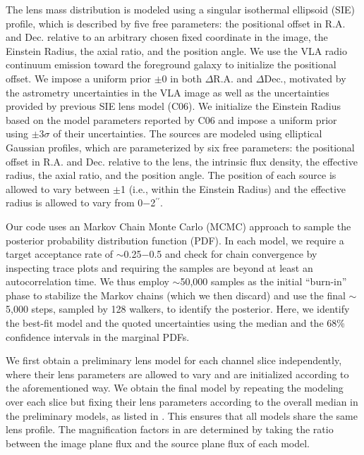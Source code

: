 \documentclass[]{emulateapj}
\begin{document}
The lens mass distribution is modeled using a singular isothermal
ellipsoid (SIE) profile, which is described by five free parameters: the
positional offset in R.A. and Dec. relative to an arbitrary chosen
fixed coordinate in the image, the Einstein Radius, the axial ratio, and the
position angle. We use the VLA radio continuum emission toward
the foreground galaxy to initialize the positional offset. We impose a
uniform prior $\pm$0 in both $\Delta$R.A. and $\Delta$Dec.,
motivated by the astrometry uncertainties in the VLA image as well as
the uncertainties provided by previous SIE lens model (C06).
We initialize the Einstein Radius based on the model parameters reported by C06
and impose a uniform prior using $\pm$3$\sigma$ of their uncertainties.
The sources are modeled using elliptical Gaussian profiles, which are
parameterized by six free parameters: the positional offset in R.A.
and Dec. relative to the lens, the intrinsic flux density, the effective
radius, the axial ratio, and the position angle. The position of each source
is allowed to vary between $\pm$1 (i.e., within the Einstein Radius)
and the effective radius is allowed to vary from 0$-$2$^{\prime\prime}$.

Our code uses an Markov Chain Monte Carlo (MCMC) approach to sample the
posterior probability distribution function (PDF).
In each model, we require a target acceptance rate of $\sim$0.25$-$0.5
and check for chain convergence by inspecting trace plots
and requiring the samples are beyond at least an autocorrelation time.
We thus employ $\sim$50,000 samples as the initial ``burn-in'' phase
to stabilize the Markov chains (which we then discard) and
use the final $\sim$5,000 steps, sampled by 128 walkers, to identify
the posterior. Here, we
identify the best-fit model and the quoted uncertainties using the
median and the 68\% confidence intervals in the marginal PDFs.


We first obtain a preliminary lens model for each channel slice independently,
where their lens parameters are allowed to vary and are initialized according
to the aforementioned way. We obtain the final model
by repeating the modeling over each slice but fixing their lens parameters
according to the overall median in the preliminary models,
as listed in .
This ensures that all models share the same lens profile.
The magnification factors in  are determined by taking the ratio
between the image plane flux and the source plane flux of each model.
\end{document}
